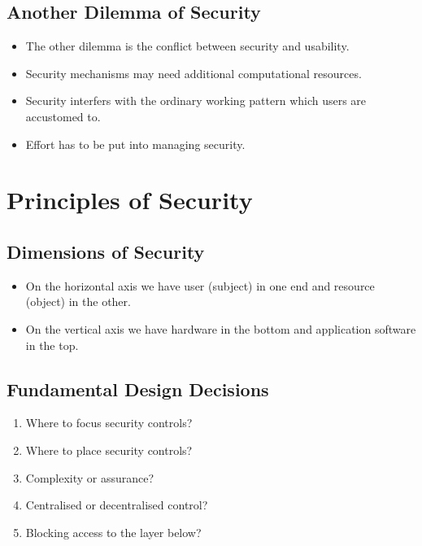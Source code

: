 \documentclass{beamer}
\begin{document}
\subsection{Another Dilemma of Security}

\begin{frame}{\insertsubsectionhead}
  \begin{itemize}
    \item The other dilemma is the conflict between security and 
      usability.
      
    \item Security mechanisms may need additional computational resources.

    \item Security interfers with the ordinary working pattern which users are 
      accustomed to.

    \item Effort has to be put into managing security.
  \end{itemize}
\end{frame}


\section{Principles of Security}

\subsection{Dimensions of Security}

\begin{frame}{\insertsubsectionhead}
  \begin{itemize}
    \item On the horizontal axis we have user (subject) in one end and resource 
      (object) in the other.

    \item On the vertical axis we have hardware in the bottom and application 
      software in the top.
  \end{itemize}
\end{frame}

\subsection{Fundamental Design Decisions}

\begin{frame}{\insertsubsectionhead}
  \begin{enumerate}
    \item Where to focus security controls?
    \item Where to place security controls?
    \item Complexity or assurance?
    \item Centralised or decentralised control?
    \item Blocking access to the layer below?
  \end{enumerate}
\end{frame}
\end{document}
